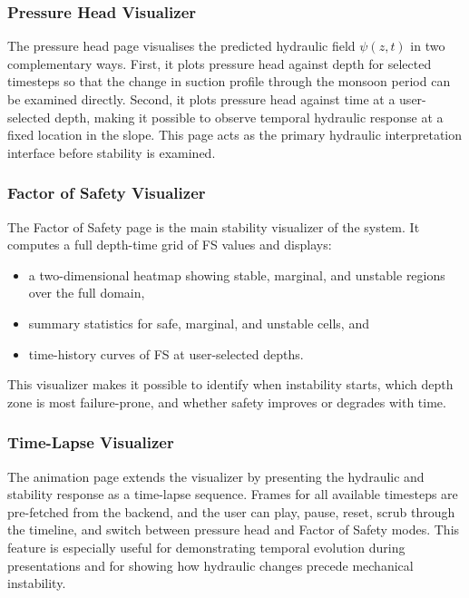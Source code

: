 \documentclass[12pt]{report}
\begin{document}
\subsubsection*{Pressure Head Visualizer}

The pressure head page visualises the predicted hydraulic field
$\psi(z,t)$ in two complementary ways. First, it plots pressure head
against depth for selected timesteps so that the change in suction
profile through the monsoon period can be examined directly. Second,
it plots pressure head against time at a user-selected depth, making it
possible to observe temporal hydraulic response at a fixed location in
the slope. This page acts as the primary hydraulic interpretation
interface before stability is examined.

\subsubsection*{Factor of Safety Visualizer}

The Factor of Safety page is the main stability visualizer of the
system. It computes a full depth-time grid of FS values and displays:

\begin{itemize}
    \item a two-dimensional heatmap showing stable, marginal, and
    unstable regions over the full domain,
    \item summary statistics for safe, marginal, and unstable cells,
    and
    \item time-history curves of FS at user-selected depths.
\end{itemize}

This visualizer makes it possible to identify when instability starts,
which depth zone is most failure-prone, and whether safety improves or
degrades with time.

\subsubsection*{Time-Lapse Visualizer}

The animation page extends the visualizer by presenting the hydraulic
and stability response as a time-lapse sequence. Frames for all
available timesteps are pre-fetched from the backend, and the user can
play, pause, reset, scrub through the timeline, and switch between
pressure head and Factor of Safety modes. This feature is especially
useful for demonstrating temporal evolution during presentations and
for showing how hydraulic changes precede mechanical instability.
\end{document}
